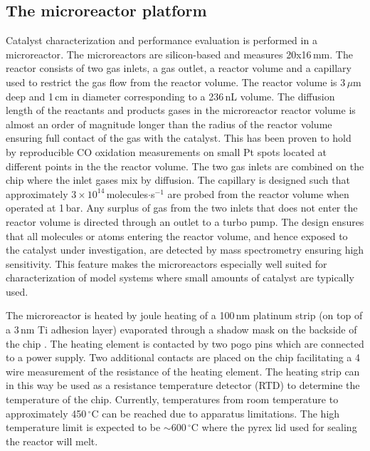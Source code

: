 \documentclass[aip,rsi]{revtex4-1}
\begin{document}
\subsection{The microreactor platform}
Catalyst characterization and performance evaluation is performed in a microreactor\cite{Henriksen2009}. The microreactors are silicon-based and measures 20x16\,mm. The reactor consists of two gas inlets, a gas outlet, a reactor volume and a capillary used to restrict the gas flow from the reactor volume. The reactor volume is 3\,$\mu$m deep and 1\,cm in diameter corresponding to a 236\,nL volume. The diffusion length of the reactants and products gases in the microreactor reactor volume is almost an order of magnitude longer than the radius of the reactor volume ensuring full contact of the gas with the catalyst. This has been proven to hold by reproducible CO oxidation measurements on small Pt spots located at different points in the the reactor volume. The two gas inlets are combined on the chip where the inlet gases mix by diffusion. The capillary is designed such that approximately $3\times10^{14}$\,molecules$\cdot$s$^{-1}$ are probed from the reactor volume when operated at 1\,bar. Any surplus of gas from the two inlets that does not enter the reactor volume is directed through an outlet to a turbo pump. The design ensures that all molecules or atoms entering the reactor volume, and hence exposed to the catalyst under investigation, are detected by mass spectrometry ensuring high sensitivity. This feature makes the microreactors especially well suited for characterization of model systems where small amounts of catalyst are typically used. 

The microreactor is heated by joule heating of a 100\,nm platinum strip (on top of a 3\,nm Ti adhesion layer) evaporated through a shadow mask on the backside of the chip . The heating element is contacted by two pogo pins which are connected to a power supply. Two additional contacts are placed on the chip facilitating a 4 wire measurement of the resistance of the heating element. The heating strip can in this way be used as a resistance temperature detector (RTD) to determine the temperature of the chip. Currently, temperatures from room temperature to approximately 450\,$^{\circ}$C can be reached due to apparatus limitations. The high temperature limit is expected to be $\sim600$\,$^{\circ}$C where the pyrex lid used for sealing the reactor will melt.
\end{document}

